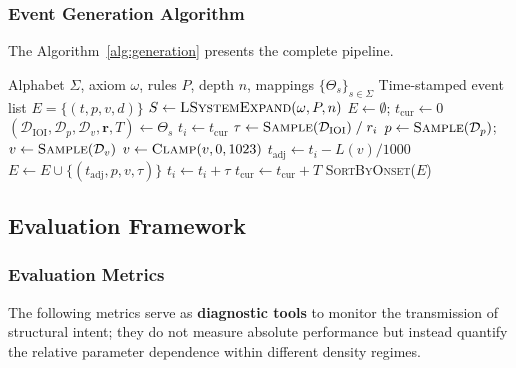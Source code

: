 \documentclass[a4paper]{article}
\theoremstyle{definition}
\theoremstyle{remark}
\begin{document}
\subsubsection{Event Generation Algorithm}

The Algorithm~\ref{alg:generation} presents the complete pipeline.

\begin{algorithm}[htbp]
\caption{Hierarchical Distribution-Switching Event Generation}
\label{alg:generation}
\begin{algorithmic}[1]
\Require Alphabet $\Sigma$, axiom $\omega$, rules $P$, depth $n$, mappings $\{\Theta_s\}_{s \in \Sigma}$
\Ensure Time-stamped event list $E = \{(t, p, v, d)\}$
\State $S \gets \textsc{LSystemExpand}(\omega, P, n)$
\State $E \gets \emptyset$;\; $t_{\text{cur}} \gets 0$
    \State $(\mathcal{D}_{\text{IOI}}, \mathcal{D}_p, \mathcal{D}_v, \mathbf{r}, T) \gets \Theta_s$
        \State $t_i \gets t_{\text{cur}}$
            \State $\tau \gets \textsc{Sample}(\mathcal{D}_{\text{IOI}}) \;/\; r_i$ 
            \State $p \gets \textsc{Sample}(\mathcal{D}_p)$;\quad $v \gets \textsc{Sample}(\mathcal{D}_v)$
            \State $v \gets \textsc{Clamp}(v, 0, 1023)$
            \State $t_{\text{adj}} \gets t_i - L(v)/1000$ 
            \State $E \gets E \cup \{(t_{\text{adj}}, p, v, \tau)\}$
            \State $t_i \gets t_i + \tau$
        \EndWhile
    \EndFor
    \State $t_{\text{cur}} \gets t_{\text{cur}} + T$
\EndFor
\State \Return \textsc{SortByOnset}($E$)
\end{algorithmic}
\end{algorithm}

\subsection{Evaluation Framework}
\label{sec:eval_framework}

\subsubsection{Evaluation Metrics}

The following metrics serve as \textbf{diagnostic tools} to monitor the transmission of structural intent; they do not measure absolute performance but instead quantify the relative parameter dependence within different density regimes.
\end{document}
